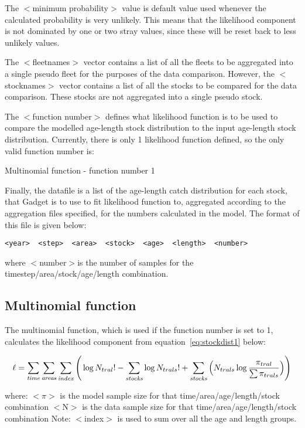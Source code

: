 \documentclass [a4paper, 10pt]{book}
\begin{document}
\bigskip
The $<$minimum probability$>$ value is default value used whenever the calculated probability is very unlikely.  This means that the likelihood component is not dominated by one or two stray values, since these will be reset back to less unlikely values.

\bigskip
The $<$fleetnames$>$ vector contains a list of all the fleets to be aggregated into a single pseudo fleet for the purposes of the data comparison.  However, the $<$stocknames$>$ vector contains a list of all the stocks to be compared for the data comparison.  These stocks are not aggregated into a single pseudo stock.

\bigskip
The $<$function number$>$ defines what likelihood function is to be used to compare the modelled age-length stock distribution to the input age-length stock distribution.  Currently, there is only 1 likelihood function defined, so the only valid function number is:

\bigskip
Multinomial function - function number 1

\bigskip
Finally, the datafile is a list of the age-length catch distribution for each stock, that Gadget is to use to fit likelihood function to, aggregated according to the aggregation files specified,  for the numbers calculated in the model.  The format of this file is given below:

\begin{verbatim}
<year>  <step>  <area>  <stock>  <age>  <length>  <number>
\end{verbatim}

where $<$number$>$is the number of samples for the timestep/area/stock/age/length combination.

\subsection{Multinomial function}
The multinomial function, which is used if the function number is set to 1, calculates the likelihood component from equation~\ref{eq:stockdist1} below:

\begin{equation}\label{eq:stockdist1}
\ell = \sum_{\it time}\sum_{\it areas}\sum_{\it index} \Bigg( \log N_{tral}! - \sum_{\it stocks} \log N_{trals}! + \sum_{\it stocks} \Big( N_{trals} \log {\frac{\pi_{tral}}{\sum \pi_{trals}}} \Big)\Bigg)
\end{equation}

where:\newline
$<$$\pi$$>$ is the model sample size for that time/area/age/length/stock combination\newline
$<$N$>$ is the data sample size for that time/area/age/length/stock combination\newline
Note: $<$index$>$ is used to sum over all the age and length groups.
\end{document}
